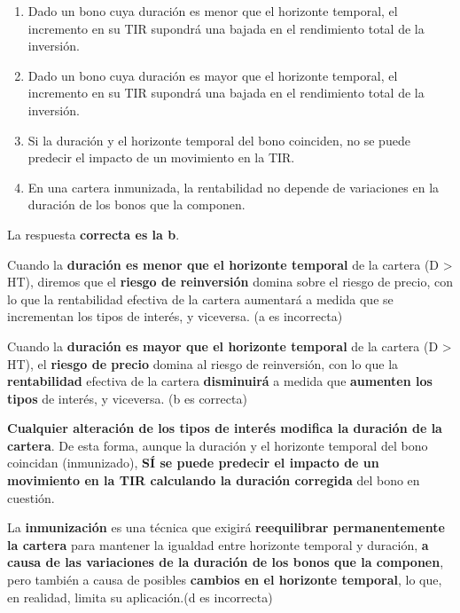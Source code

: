 \documentclass[
  letterpaper,
  DIV=11,
  numbers=noendperiod]{scrartcl}
\begin{document}
\begin{enumerate}
\def\labelenumi{\alph{enumi}.}
\item
  Dado un bono cuya duración es menor que el horizonte temporal, el
  incremento en su TIR supondrá una bajada en el rendimiento total de la
  inversión.
\item
  Dado un bono cuya duración es mayor que el horizonte temporal, el
  incremento en su TIR supondrá una bajada en el rendimiento total de la
  inversión.
\item
  Si la duración y el horizonte temporal del bono coinciden, no se puede
  predecir el impacto de un movimiento en la TIR.
\item
  En una cartera inmunizada, la rentabilidad no depende de variaciones
  en la duración de los bonos que la componen.
\end{enumerate}

\begin{tcolorbox}[enhanced jigsaw, colframe=quarto-callout-note-color-frame, opacityback=0, colback=white, leftrule=.75mm, left=2mm, breakable, arc=.35mm, rightrule=.15mm, toprule=.15mm, bottomrule=.15mm]
\begin{minipage}[t]{5.5mm}
\textcolor{quarto-callout-note-color}{\faInfo}
\end{minipage}%
\begin{minipage}[t]{\textwidth - 5.5mm}

La respuesta \textbf{correcta es la b}.

Cuando la \textbf{duración es menor que el horizonte temporal} de la
cartera (D \textgreater{} HT), diremos que el \textbf{riesgo de
reinversión} domina sobre el riesgo de precio, con lo que la
rentabilidad efectiva de la cartera aumentará a medida que se
incrementan los tipos de interés, y viceversa. (a es incorrecta)

Cuando la \textbf{duración es mayor que el horizonte temporal} de la
cartera (D \textgreater{} HT), el \textbf{riesgo de precio} domina al
riesgo de reinversión, con lo que la \textbf{rentabilidad} efectiva de
la cartera \textbf{disminuirá} a medida que \textbf{aumenten los tipos}
de interés, y viceversa. (b es correcta)

\textbf{Cualquier alteración de los tipos de interés modifica la
duración de la cartera}. De esta forma, aunque la duración y el
horizonte temporal del bono coincidan (inmunizado), \textbf{SÍ se puede
predecir el impacto de un movimiento en la TIR calculando la duración
corregida} del bono en cuestión.

La \textbf{inmunización} es una técnica que exigirá \textbf{reequilibrar
permanentemente la cartera} para mantener la igualdad entre horizonte
temporal y duración, \textbf{a causa de las variaciones de la duración
de los bonos que la componen}, pero también a causa de posibles
\textbf{cambios en el horizonte temporal}, lo que, en realidad, limita
su aplicación.(d es incorrecta)

\end{minipage}%
\end{tcolorbox}
\end{document}
